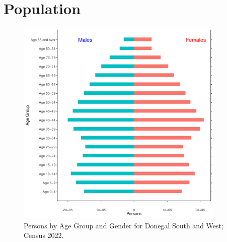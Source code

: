 \documentclass{article}
\begin{document}
\pagebreak

\section{Population} 
\label{sect:Pop}

\begin{figure}[h]
	\centering
	\includegraphics[width = 100mm]{../figures/PyramidPlot.pdf}
	\caption{Persons by Age Group and Gender for Donegal South and West; Census 2022.}
	\label{fig:2ae19629-1a6a-13a3-e055-000000000001}
	\end{figure}
\end{document}
